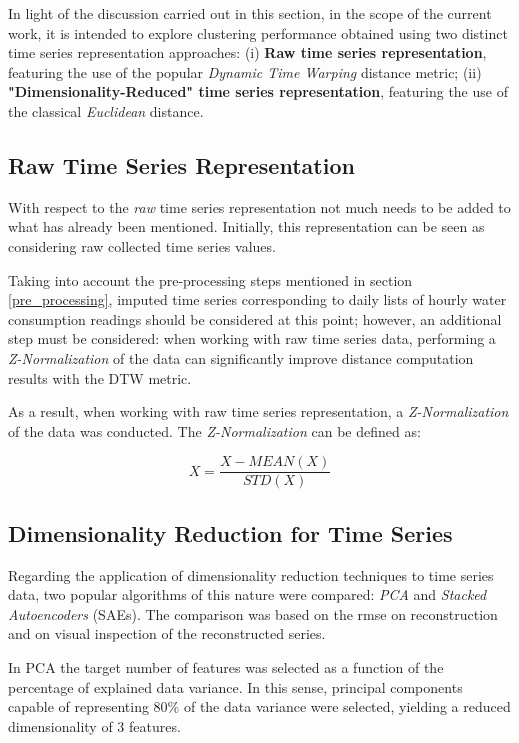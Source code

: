 \documentclass[9pt,journal,compsoc]{IEEEtran}
\begin{document}
In light of the discussion carried out in this section, in the scope of the current work, it is intended to explore clustering performance obtained using two distinct time series representation approaches: (i) \textbf{Raw time series representation}, featuring the use of the popular \emph{Dynamic Time Warping} distance metric; (ii) \textbf{"Dimensionality-Reduced" time series representation}, featuring the use of the classical \emph{Euclidean} distance.

\subsection{Raw Time Series Representation}

With respect to the \emph{raw} time series representation not much needs to be added to what has already been mentioned. Initially, this representation can be seen as considering raw collected time series values.

Taking into account the pre-processing steps mentioned in section \ref{pre_processing}, imputed time series corresponding to daily lists of hourly water consumption readings should be considered at this point; however, an additional step must be considered: when working with raw time series data, performing a \emph{Z-Normalization} of the data can significantly improve distance computation results with the DTW metric\cite{mueen2016extracting}.

As a result, when working with raw time series representation, a \emph{Z-Normalization} of the data was conducted. The \emph{Z-Normalization} can be defined as:

$$X = \frac{X - MEAN(X)}{STD(X)} $$

\subsection{Dimensionality Reduction for Time Series}

Regarding the application of dimensionality reduction techniques to time series data, two popular algorithms of this nature were compared: \emph{PCA} and \emph{Stacked Autoencoders} (SAEs). The comparison was based on the rmse on reconstruction and on visual inspection of the reconstructed series.

In PCA the target number of features was selected as a function of the percentage of explained data variance. In this sense, principal components capable of representing $80\%$ of the data variance were selected, yielding a reduced dimensionality of 3 features.
\end{document}
